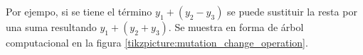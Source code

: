 \begin{itemize}
\begin{itemize}
                    Por ejempo, si se tiene el término $y_1 + (y_2 - y_3)$ se puede sustituir la resta por una suma resultando $y_1 + (y_2 + y_3)$. Se muestra en forma de árbol computacional en la figura \ref{tikzpicture:mutation_change_operation}.

                    \begin{center}



\end{center}
\end{itemize}
\end{itemize}
